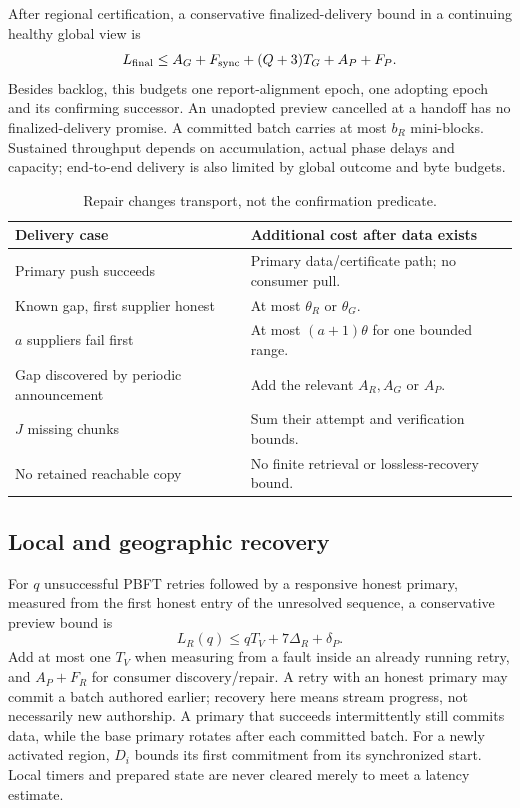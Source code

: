 \documentclass[11pt,a4paper,onecolumn]{article}
\theoremstyle{remark}\newtheorem{example}[definition]{Example}
\begin{document}
After regional certification, a conservative finalized-delivery bound in a
continuing healthy global view is
\begin{equation}\label{eq:deliver}
 L_{\rm final}\leq A_G+F_{\rm sync}+(Q+3)T_G+A_P+F_P.
\end{equation}
Besides backlog, this budgets one report-alignment epoch, one adopting epoch
and its confirming successor. An unadopted preview cancelled at a handoff has
no finalized-delivery promise. A committed batch carries at most $b_R$ mini-blocks.
Sustained throughput depends on accumulation, actual phase delays and capacity;
end-to-end delivery is also limited by global outcome and byte budgets.

\begin{table}[htbp]\centering\small
\begin{tabularx}{\textwidth}{@{}p{}Y@{}}\toprule
Delivery case & Additional cost after data exists\\\midrule
Primary push succeeds & Primary data/certificate path; no consumer pull.\\
Known gap, first supplier honest & At most $\theta_R$ or $\theta_G$.\\
$a$ suppliers fail first & At most $(a+1)\theta$ for one bounded range.\\
Gap discovered by periodic announcement & Add the relevant $A_R,A_G$ or $A_P$.\\
$J$ missing chunks & Sum their attempt and verification bounds.\\
No retained reachable copy & No finite retrieval or lossless-recovery bound.\\\bottomrule
\end{tabularx}
\caption{Repair changes transport, not the confirmation predicate.}
\end{table}

\subsection{Local and geographic recovery}\label{sec:recoverybounds}

For $q$ unsuccessful PBFT retries followed by a responsive honest primary,
measured from the first honest entry of the unresolved sequence, a conservative
preview bound is
\begin{equation}\label{eq:localrecover}
 L_R(q)\leq qT_V+7\Delta_R+\delta_P.
\end{equation}
Add at most one $T_V$ when measuring from a fault inside an already running
retry, and $A_P+F_R$ for consumer discovery/repair. A retry with an honest
primary may commit a batch authored earlier; recovery here means stream
progress, not necessarily new authorship. A primary that succeeds intermittently
still commits data, while the base primary rotates after each committed batch.
For a newly activated region, $D_i$ bounds its first commitment from its
synchronized start. Local timers and prepared state are never cleared merely
to meet a latency estimate.
\end{document}
